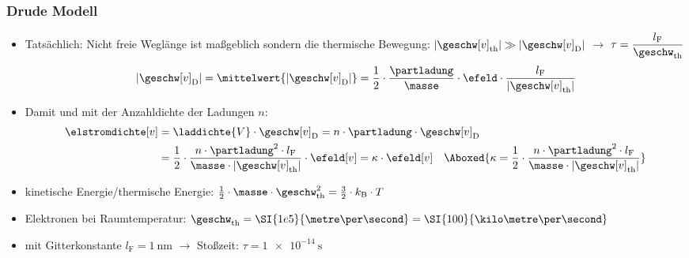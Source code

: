 \begin{frame}
  \frametitle{Drude Modell}
\begin{itemize}[<+->]      
\item Tatsächlich: Nicht freie Weglänge ist maßgeblich sondern die \alert{thermische Bewegung}: \(|\geschw[v]_\mathrm{th}| \gg |\geschw[v]_\mathrm{D}| \) $\to$ $\tau  = \dfrac{l_\mathrm{F}}{\geschw_\mathrm{th}}$ 
$$
	|\geschw[v]_\mathrm{D}| = \mittelwert{|\geschw[v]_\mathrm{D}|} = \dfrac{1}{2} \cdot \dfrac{\partladung}{\masse} \cdot \efeld \cdot \dfrac{l_\mathrm{F}}{|\geschw[v]_\mathrm{th}|}
$$
\item Damit und mit der Anzahldichte der Ladungen \(n\):
  \begin{align*}
	\elstromdichte[v] &= \laddichte{V} \cdot \geschw[v]_\mathrm{D} = n \cdot \partladung \cdot \geschw[v]_\mathrm{D}\\
		&= \dfrac{1}{2} \cdot \dfrac{n \cdot \partladung^2 \cdot l_\mathrm{F}}{\masse \cdot |\geschw[v]_\mathrm{th}|} \cdot \efeld[v] = \kappa \cdot \efeld[v]\quad\Aboxed{\kappa= \dfrac{1}{2} \cdot \dfrac{n \cdot \partladung^2 \cdot l_\mathrm{F}}{\masse \cdot |\geschw[v]_\mathrm{th}|}}  
\end{align*}
\item kinetische Energie/thermische Energie:
$\frac{1}{2} \cdot \masse \cdot \geschw_\mathrm{th}^2 = \frac{3}{2} \cdot k_\mathrm{B} \cdot T$
\item Elektronen bei Raumtemperatur:
$\geschw_\mathrm{th} = \SI{1e5}{\metre\per\second} = \SI{100}{\kilo\metre\per\second}$
\item mit Gitterkonstante \(l_\mathrm{F} = \SI{1}{\nano\metre} \) $\to$ Stoßzeit:
$\tau = \SI{1e-14}{\second}$
  \end{itemize}
\end{frame}
 
